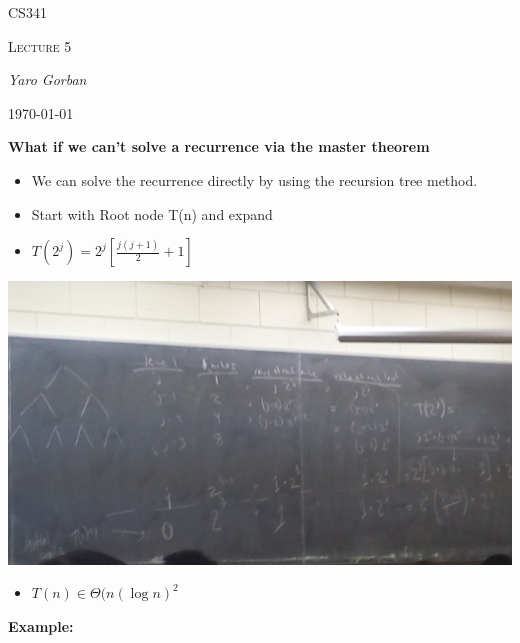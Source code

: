 \documentclass[12pt,a4paper]{report}
\begin{document}
	\centering
	{\scshape\LARGE CS341 \par}
	{\scshape\Large Lecture 5\par}
	{\Large\itshape Yaro Gorban\par}
	{\large \today\par}
	\vspace{1.5cm}

\textbf{What if we can't solve a recurrence via the master theorem}
\begin{itemize}
\item We can solve the recurrence directly by using the recursion tree method.
\item Start with Root node T(n) and expand
\item $T(2^j) = 2^j[\frac{j(j+1)}{2} + 1]$
\end{itemize}
\includegraphics[scale=0.1,angle=180]{note}
\begin{itemize}
\item $T(n) \in \Theta (n(\log n)^2$
\end{itemize}
\textbf{Example:}
\end{document}
